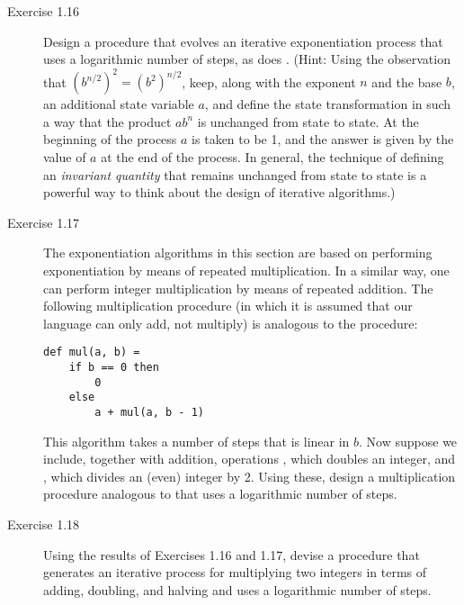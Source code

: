 \begin{description}
\item[Exercise 1.16] Design a procedure that evolves an iterative exponentiation process that uses a logarithmic number of steps, as does . (Hint: Using the observation that $(b^{n/2})^2 = (b^2)^{n/2}$, keep, along with the exponent $n$ and the base $b$, an additional state variable $a$, and define the state transformation in such a way that the product $a b^n$ is unchanged from state to state. At the beginning of the process $a$ is taken to be 1, and the answer is given by the value of $a$ at the end of the process. In general, the technique of defining an \emph{invariant quantity} that remains unchanged from state to state is a powerful way to think about the design of iterative algorithms.)

\item[Exercise 1.17] The exponentiation algorithms in this section are based on performing exponentiation by means of repeated multiplication. In a similar way, one can perform integer multiplication by means of repeated addition. The following multiplication procedure (in which it is assumed that our language can only add, not multiply) is analogous to the  procedure:

\begin{lstlisting}
def mul(a, b) =
    if b == 0 then
        0
    else
        a + mul(a, b - 1)
\end{lstlisting}

This algorithm takes a number of steps that is linear in $b$. Now suppose we include, together with addition, operations , which doubles an integer, and , which divides an (even) integer by 2. Using these, design a multiplication procedure analogous to  that uses a logarithmic number of steps.

\item[Exercise 1.18] Using the results of Exercises 1.16 and 1.17, devise a procedure that generates an iterative process for multiplying two integers in terms of adding, doubling, and halving and uses a logarithmic number of steps.


\end{description}
